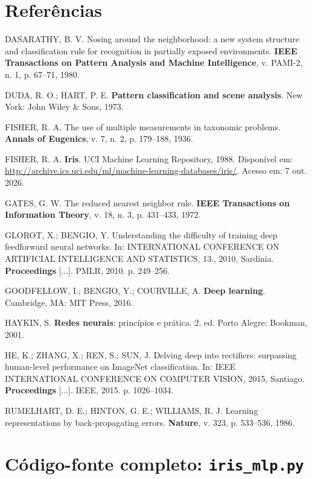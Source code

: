 \documentclass[12pt,a4paper]{article}
\begin{document}
\section*{Referências}
\begin{singlespace}
\setlength{\parindent}{0pt}
\setlength{\parskip}{0.5\baselineskip}
\raggedright

DASARATHY, B. V. Nosing around the neighborhood: a new system structure and classification rule for
recognition in partially exposed environments. \textbf{IEEE Transactions on Pattern Analysis and
Machine Intelligence}, v. PAMI-2, n. 1, p. 67--71, 1980.

DUDA, R. O.; HART, P. E. \textbf{Pattern classification and scene analysis}. New York: John Wiley \&
Sons, 1973.

FISHER, R. A. The use of multiple measurements in taxonomic problems. \textbf{Annals of Eugenics},
v. 7, n. 2, p. 179--188, 1936.

FISHER, R. A. \textbf{Iris}. UCI Machine Learning Repository, 1988. Disponível em:
\url{http://archive.ics.uci.edu/ml/machine-learning-databases/iris/}. Acesso em: 7 out. 2026.

GATES, G. W. The reduced nearest neighbor rule. \textbf{IEEE Transactions on Information Theory},
v. 18, n. 3, p. 431--433, 1972.

GLOROT, X.; BENGIO, Y. Understanding the difficulty of training deep feedforward neural networks. In:
INTERNATIONAL CONFERENCE ON ARTIFICIAL INTELLIGENCE AND STATISTICS, 13., 2010, Sardinia.
\textbf{Proceedings} [...]. PMLR, 2010. p. 249--256.

GOODFELLOW, I.; BENGIO, Y.; COURVILLE, A. \textbf{Deep learning}. Cambridge, MA: MIT Press,
2016.

HAYKIN, S. \textbf{Redes neurais}: princípios e prática. 2. ed. Porto Alegre: Bookman,
2001.

HE, K.; ZHANG, X.; REN, S.; SUN, J. Delving deep into rectifiers: surpassing human-level performance
on ImageNet classification. In: IEEE INTERNATIONAL CONFERENCE ON COMPUTER VISION, 2015, Santiago.
\textbf{Proceedings} [...]. IEEE, 2015. p. 1026--1034.

RUMELHART, D. E.; HINTON, G. E.; WILLIAMS, R. J. Learning representations by back-propagating errors.
\textbf{Nature}, v. 323, p. 533--536, 1986.
\end{singlespace}

\appendix
\section{Código-fonte completo: \texttt{iris\_mlp.py}}
\label{ap:codigo}
\end{document}
